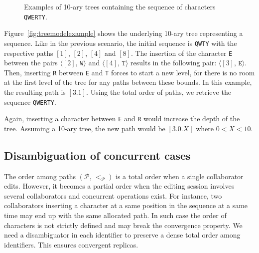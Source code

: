 \begin{figure*}
  \centering
  \hspace{20pt}
  \caption{Examples of 10-ary trees containing the sequence of characters
    \texttt{QWERTY}.}
\end{figure*}


Figure~\ref{fig:treemodelexample} shows the underlying 10-ary tree representing
a sequence. Like in the previous scenario, the initial sequence is \texttt{QWTY}
with the respective paths $[1]$, $[2]$, $[4]$ and $[8]$. The insertion of the
character \texttt{E} between the pairs $\langle [2],\, \texttt{W}\rangle$ and
$\langle [4],\, \texttt{T}\rangle$ results in the following pair:
$\langle [3],\, \texttt{E} \rangle$. Then, inserting \texttt{R} between
\texttt{E} and \texttt{T} forces to start a new level, for there is no room at
the first level of the tree for any paths between these bounds. In this example,
the resulting path is $[3.1]$. Using the total order of paths, we retrieve the
sequence \texttt{QWERTY}.

\noindent Again, inserting a character between \texttt{E} and \texttt{R} would increase
the depth of the tree.
Assuming a 10-ary tree, the new path would be $[3.0.X]$ where $0<X<10$. 



\subsection{Disambiguation of concurrent cases}
\label{subsec:disambiguation}

The order among paths $(\mathcal{P},\,<_\mathcal{P})$ is a total order when a
single collaborator edits. However, it becomes a partial order when the editing
session involves several collaborators and concurrent operations exist. For
instance, two collaborators inserting a character at a same position in the
sequence at a same time may end up with the same allocated path. In such case
the order of characters is not strictly defined and may break the convergence
property. We need a disambiguator in each identifier to preserve a dense total
order among identifiers. This ensures convergent replicas.

